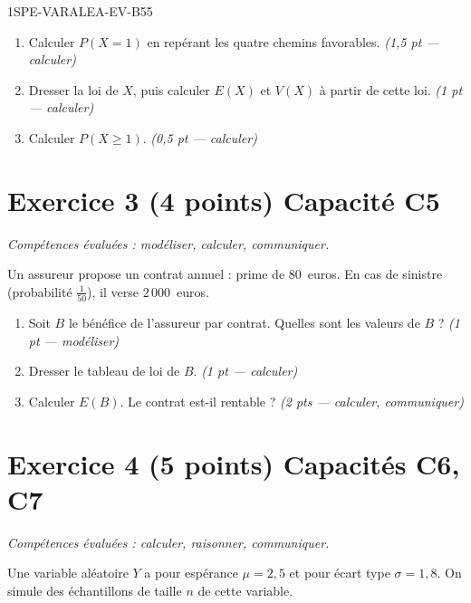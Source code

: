 \begin{evaluation}{1SPE-VARALEA-EV-B}{55}
\begin{enumerate}
  \item Calculer $P(X = 1)$ en repérant les quatre chemins favorables.
  \hfill\textit{(1{,}5 pt — calculer)}

  \item Dresser la loi de $X$, puis calculer $E(X)$ et $V(X)$ à partir de cette loi.
  \hfill\textit{(1 pt — calculer)}

  \item Calculer $P(X \geq 1)$.
  \hfill\textit{(0{,}5 pt — calculer)}
\end{enumerate}

\section*{Exercice 3 \hfill (4 points) \hfill Capacité C5}

\textit{Compétences évaluées : modéliser, calculer, communiquer.}

\medskip
Un assureur propose un contrat annuel : prime de $80$~euros. En cas de sinistre (probabilité $\frac{1}{50}$), il verse $2\,000$~euros.

\begin{enumerate}
  \item Soit $B$ le bénéfice de l'assureur par contrat. Quelles sont les valeurs de $B$ ?
  \hfill\textit{(1 pt — modéliser)}

  \item Dresser le tableau de loi de $B$.
  \hfill\textit{(1 pt — calculer)}

  \item Calculer $E(B)$. Le contrat est-il rentable ?
  \hfill\textit{(2 pts — calculer, communiquer)}

\end{enumerate}

\section*{Exercice 4 \hfill (5 points) \hfill Capacités C6, C7}

\textit{Compétences évaluées : calculer, raisonner, communiquer.}

\medskip
Une variable aléatoire $Y$ a pour espérance $\mu = 2{,}5$ et pour écart type
$\sigma = 1{,}8$. On simule des échantillons de taille $n$ de cette variable.


\end{evaluation}
